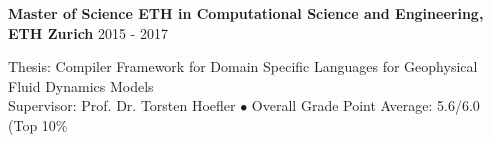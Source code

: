 \textbf{Master of Science ETH in Computational Science and Engineering, ETH Zurich} \hfill 2015 - 2017

Thesis: Compiler Framework for Domain Specific Languages for Geophysical Fluid Dynamics Models \\
Supervisor: Prof. Dr. Torsten Hoefler $\bullet$ Overall Grade Point Average: 5.6/6.0 (Top 10\%
